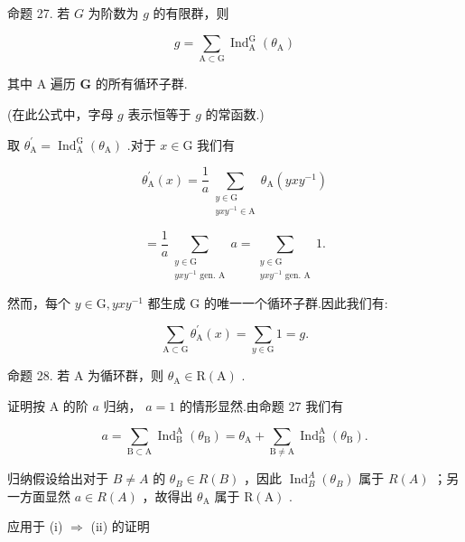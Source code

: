 \documentclass[10pt]{article}
\begin{document}
命题 27. 若 \(G\) 为阶数为 \(g\) 的有限群，则

\[
g = \mathop{\sum }\limits_{{\mathrm{A} \subset  \mathrm{G}}}{\operatorname{Ind}}_{\mathrm{A}}^{\mathrm{G}}\left( {\theta }_{\mathrm{A}}\right)
\]

其中 A 遍历 \(\mathbf{G}\) 的所有循环子群.

(在此公式中，字母 \(g\) 表示恒等于 \(g\) 的常函数.)

取 \({\theta }_{\mathrm{A}}^{\prime } = {\operatorname{Ind}}_{\mathrm{A}}^{\mathrm{G}}\left( {\theta }_{\mathrm{A}}\right)\) .对于 \(x \in  \mathrm{G}\) 我们有

\[
{\theta }_{\mathrm{A}}^{\prime }\left( x\right)  = \frac{1}{a}\mathop{\sum }\limits_{\substack{{y \in  \mathrm{G}} \\  {{yx}{y}^{-1} \in  \mathrm{A}} }}{\theta }_{\mathrm{A}}\left( {{yx}{y}^{-1}}\right)
\]

\[
= \frac{1}{a}\mathop{\sum }\limits_{\substack{{y \in  \mathrm{G}} \\  {{yx}{y}^{-1}\text{ gen. }\mathrm{A}} }}a = \mathop{\sum }\limits_{\substack{{y \in  \mathrm{G}} \\  {{yx}{y}^{-1}\text{ gen. }\mathrm{A}} }}1.
\]

然而，每个 \(y \in  \mathrm{G},{yx}{y}^{-1}\) 都生成 \(\mathrm{G}\) 的唯一一个循环子群.因此我们有:

\[
\mathop{\sum }\limits_{{\mathrm{A} \subset  \mathrm{G}}}{\theta }_{\mathrm{A}}^{\prime }\left( x\right)  = \mathop{\sum }\limits_{{y \in  \mathrm{G}}}1 = g.
\]

命题 28. 若 \(\mathrm{A}\) 为循环群，则 \({\theta }_{\mathrm{A}} \in  \mathrm{R}\left( \mathrm{A}\right)\) .

证明按 \(\mathrm{A}\) 的阶 \(a\) 归纳， \(a = 1\) 的情形显然.由命题 27 我们有

\[
a = \mathop{\sum }\limits_{{\mathrm{B} \subset  \mathrm{A}}}{\operatorname{Ind}}_{\mathrm{B}}^{\mathrm{A}}\left( {\theta }_{\mathrm{B}}\right)  = {\theta }_{\mathrm{A}} + \mathop{\sum }\limits_{{\mathrm{B} \neq  \mathrm{A}}}{\operatorname{Ind}}_{\mathrm{B}}^{\mathrm{A}}\left( {\theta }_{\mathrm{B}}\right) .
\]

归纳假设给出对于 \(B \neq  A\) 的 \({\theta }_{B} \in  R\left( B\right)\) ，因此 \({\operatorname{Ind}}_{B}^{A}\left( {\theta }_{B}\right)\) 属于 \(R\left( A\right)\) ；另一方面显然 \(a \in  R\left( A\right)\) ，故得出 \({\theta }_{\mathrm{A}}\) 属于 \(\mathrm{R}\left( \mathrm{A}\right)\) .

应用于 (i) \(\Rightarrow\) (ii) 的证明
\end{document}
